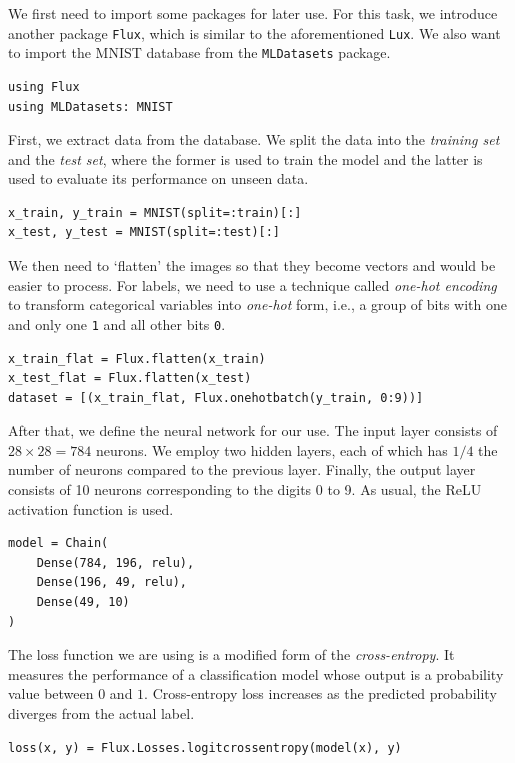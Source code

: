 \documentclass[a4paper,11pt,titlepage]{article}
\theoremstyle{definition}
\theoremstyle{plain}
\theoremstyle{remark}
\begin{document}
We first need to import some packages for later use. For this task, we introduce another package \verb|Flux|, which is similar to the aforementioned \verb|Lux|. We also want to import the MNIST database from the \verb|MLDatasets| package.

\begin{verbatim}
using Flux
using MLDatasets: MNIST
\end{verbatim}

First, we extract data from the database. We split the data into the \textit{training set} and the \textit{test set}, where the former is used to train the model and the latter is used to evaluate its performance on unseen data.

\begin{verbatim}
x_train, y_train = MNIST(split=:train)[:]
x_test, y_test = MNIST(split=:test)[:]
\end{verbatim}

We then need to ‘flatten’ the images so that they become vectors and would be easier to process. For labels, we need to use a technique called \textit{one-hot encoding} to transform categorical variables into \textit{one-hot} form, i.e., a group of bits with one and only one \verb|1| and all other bits \verb|0|.

\begin{verbatim}
x_train_flat = Flux.flatten(x_train)
x_test_flat = Flux.flatten(x_test)
dataset = [(x_train_flat, Flux.onehotbatch(y_train, 0:9))]
\end{verbatim}

After that, we define the neural network for our use. The input layer consists of $28\times 28 = 784$ neurons. We employ two hidden layers, each of which has $1/4$ the number of neurons compared to the previous layer. Finally, the output layer consists of 10 neurons corresponding to the digits 0 to 9. As usual, the ReLU activation function is used.

\begin{verbatim}
model = Chain(
    Dense(784, 196, relu),
    Dense(196, 49, relu),
    Dense(49, 10)
)
\end{verbatim}

The loss function we are using is a modified form of the \textit{cross-entropy}. It measures the performance of a classification model whose output is a probability value between $0$ and $1$. Cross-entropy loss increases as the predicted probability diverges from the actual label.

\begin{verbatim}
loss(x, y) = Flux.Losses.logitcrossentropy(model(x), y)
\end{verbatim}
\end{document}
